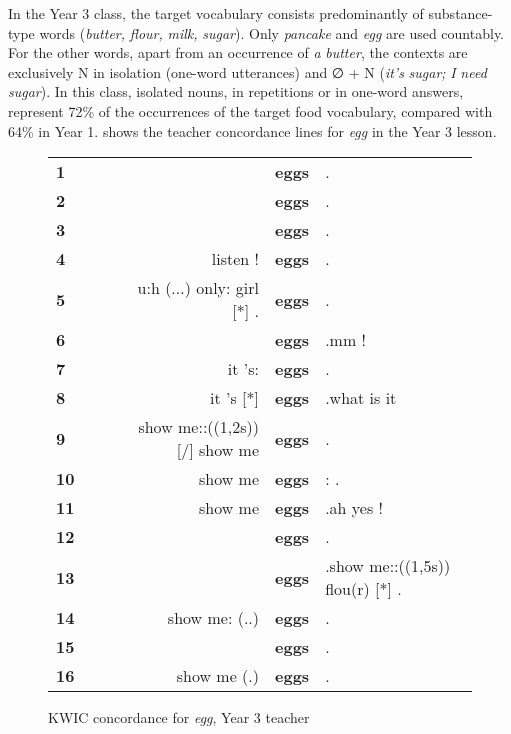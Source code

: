\documentclass[output=paper,colorlinks,citecolor=brown,modfonts,nonflat]{../langscibook}
\begin{document}
In the Year 3 class, the target vocabulary consists predominantly of substance-type words (\textit{butter,} \textit{flour,} \textit{milk,} \textit{sugar}). Only \textit{pancake} and \textit{egg} are used countably. For the other words, apart from an occurrence of \textit{a} \textit{butter}, the contexts are exclusively N in isolation (one-word utterances) and ∅ + N (\textit{it’s} \textit{sugar;} \textit{I} \textit{need} \textit{sugar}). In this class, isolated nouns, in repetitions or in one-word answers, represent 72\% of the occurrences of the target food vocabulary, compared with 64\% in Year 1.  shows the teacher concordance lines for \textit{egg} in the Year 3 lesson.

\begin{figure}
\caption{\label{tabfig:hilton:9}KWIC concordance for  {\textit{egg}},  {Year}  {3}  {teacher}}
\ttfamily\footnotesize
\begin{tabular}{l@{}l@{}lr@{~}l@{~}l}
\lsptoprule
 \textbf{1} &   &  &  & \textbf{eggs} & .\\
 \textbf{2} &   &  &  & \textbf{eggs} & .\\
 \textbf{3} &   &  &  & \textbf{eggs} & .\\
 \textbf{4} &   &  &  listen ! & \textbf{eggs} & .\\
 \textbf{5} &   &  &  u:h (...) only: girl [*] . & \textbf{eggs} & .\\
 \textbf{6} &   &  &  & \textbf{eggs} & .mm !\\
 \textbf{7} &   &  &  it 's: & \textbf{eggs} & .\\
 \textbf{8} &   &  &  it 's [*] & \textbf{eggs} & .what is it\\
 \textbf{9} &   &  &  show me::((1,2s))[/] show me &  \textbf{eggs} & .\\
 \textbf{10} &  &  &  show me & \textbf{eggs} & : .\\
 \textbf{11} &  &  &  show me & \textbf{eggs} & .ah yes !\\
 \textbf{12} &  &  &  & \textbf{eggs} & .\\
 \textbf{13} &  &  &  & \textbf{eggs} & .show me::((1,5s)) flou(r) [*] .\\
 \textbf{14} &  &  &  show me: (..) & \textbf{eggs} & .\\
 \textbf{15} &  &  &  & \textbf{eggs} & .\\
 \textbf{16} &  &  &  show me (.) & \textbf{eggs} & .\\

\end{tabular}
\end{figure}
\end{document}
